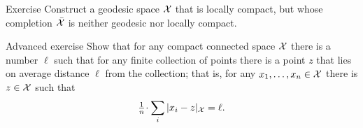 \begin{thm}{Exercise}\label{exercise from BH}
Construct a geodesic space $\mathcal{X}$ that is locally compact,
but whose completion $\bar{\mathcal{X}}$ is neither geodesic nor locally compact.
\end{thm}


\begin{thm}{Advanced exercise}\label{ex:gross}
Show that for any compact connected space $\mathcal{X}$ there is a number $\ell$ such that for any finite collection of points there is a point $z$ that lies on average distance $\ell$ from the collection;
that is, for any $x_1,\dots,x_n\in \mathcal{X}$ there is $z\in \mathcal{X}$ such that
\[\tfrac1n\cdot\sum_i|x_i-z|_{\spc{X}}=\ell.\]
\end{thm}






